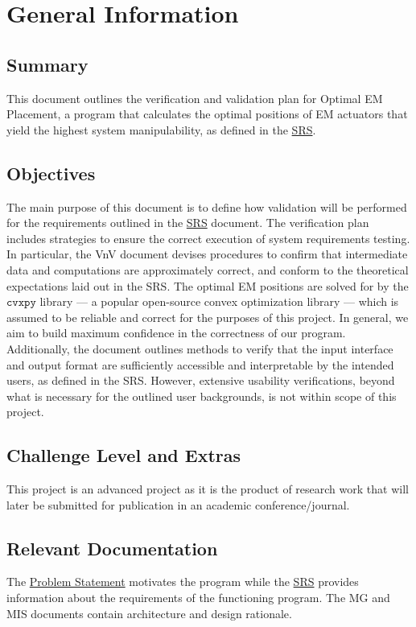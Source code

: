 \documentclass[12pt, titlepage]{article}
\begin{document}
\section{General Information} \label{gen_info}

\subsection{Summary}
This document outlines the verification and validation plan for Optimal EM Placement, a program that calculates the optimal positions of EM actuators that yield the highest system manipulability, as defined in the \href{https://github.com/husseinsd1/optimal-em-arrangement/blob/main/docs/SRS/SRS.pdf}{SRS}. 

\subsection{Objectives}
The main purpose of this document is to define how validation will be performed for the requirements outlined in the \href{https://github.com/husseinsd1/optimal-em-arrangement/blob/main/docs/SRS/SRS.pdf}{SRS} document. The verification plan includes strategies to ensure the correct execution of system requirements testing. In particular, the VnV document devises procedures to confirm that intermediate data and computations are approximately correct, and conform to the theoretical expectations laid out in the SRS. The optimal EM positions are solved for by the \href{https://www.cvxpy.org/}{$\texttt{cvxpy}$} library --- a popular open-source convex optimization library --- which is assumed to be reliable and correct for the purposes of this project. In general, we aim to build maximum confidence in the correctness of our program. Additionally, the document outlines methods to verify that the input interface and output format are sufficiently accessible and interpretable by the intended users, as defined in the SRS. However, extensive usability verifications, beyond what is necessary for the outlined user backgrounds, is not within scope of this project.

\subsection{Challenge Level and Extras}
This project is an advanced project as it is the product of research work that will later be submitted for publication in an academic conference/journal.  

\subsection{Relevant Documentation}
The \href{https://github.com/husseinsd1/optimal-em-arrangement/blob/main/docs/ProblemStatementAndGoals/ProblemStatement.pdf}{Problem Statement} motivates the program while the \href{https://github.com/husseinsd1/optimal-em-arrangement/blob/main/docs/SRS/SRS.pdf}{SRS} provides information about the requirements of the functioning program. The MG and MIS documents contain architecture and design rationale. 
\end{document}
